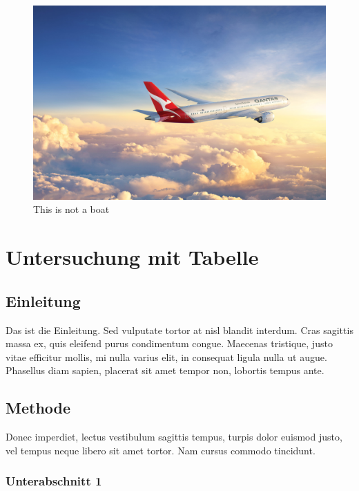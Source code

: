 \documentclass[listof=totoc,index=totoc,bibliography=totoc,12pt,german,a4paper,]{report}
\begin{document}
\begin{figure}
\hypertarget{fig:other_fig}{%
\centering
\includegraphics[width=1\textwidth,height=\textheight]{source/figures/full_caption_example.jpg}
\caption{This is not a boat}\label{fig:other_fig}
}
\end{figure}

\chapter{Untersuchung mit Tabelle}\label{sec:research-table}

\section{Einleitung}\label{einleitung-3}

Das ist die Einleitung. Sed vulputate tortor at nisl blandit interdum.
Cras sagittis massa ex, quis eleifend purus condimentum congue. Maecenas
tristique, justo vitae efficitur mollis, mi nulla varius elit, in
consequat ligula nulla ut augue. Phasellus diam sapien, placerat sit
amet tempor non, lobortis tempus ante.

\section{Methode}\label{methode-2}

Donec imperdiet, lectus vestibulum sagittis tempus, turpis dolor euismod
justo, vel tempus neque libero sit amet tortor. Nam cursus commodo
tincidunt.

\subsection{Unterabschnitt 1}\label{unterabschnitt-1-1}
\end{document}
